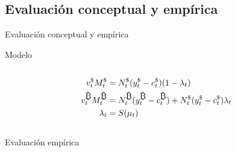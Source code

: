 \subsection{Evaluación conceptual y empírica}

\begin{frame}{Evaluación conceptual y empírica}
    
    \begin{block}{Modelo}
    
    \begin{minipage}[t][.20\textheight][t]{\textwidth}

        \begin{column}{0.30\textwidth}
            \tiny
            \begin{align*}
            v_{t}^{\$}{M_{t}^{\$}}&=     N_{t}^{\$}(y_{t}^{\$}-c_{t}^{\$})
            (1-\lambda_t)\\
            v_{t}^{\bitcoinA}{M_{t}^{\bitcoinA}}&=N_{t}^{\bitcoinA}(y_{t}^{\bitcoinA}-c_{t}^{\bitcoinA})+{N_{t}^{\$}(y_{t}^{\$}-c_{t}^{\$})}\lambda_t\\
            {\lambda_t}&={S}({\mu_t})
            \end{align*}
        \end{column}
        \begin{column}{0.45\textwidth}
        
        \end{column}
        
    \end{minipage}
    \end{block}

\begin{block}{Evaluación empírica}
    
    \begin{minipage}[t][.40\textheight][t]{\textwidth}


\end{minipage}
\end{block}
\end{frame}
